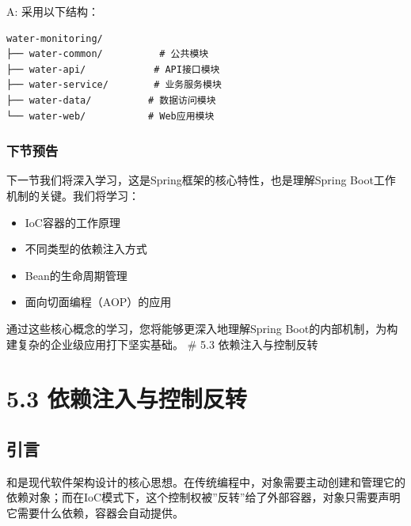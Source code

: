 
A: 采用以下结构：

\begin{lstlisting}
water-monitoring/
├── water-common/          # 公共模块
├── water-api/            # API接口模块  
├── water-service/        # 业务服务模块
├── water-data/          # 数据访问模块
└── water-web/           # Web应用模块
\end{lstlisting}

\hypertarget{ux4e0bux8282ux9884ux544a-1}{%
\subsubsection{下节预告}\label{ux4e0bux8282ux9884ux544a-1}}

下一节我们将深入学习，这是Spring框架的核心特性，也是理解Spring Boot工作机制的关键。我们将学习：

\begin{itemize}
\tightlist
\item
  IoC容器的工作原理
\item
  不同类型的依赖注入方式
\item
  Bean的生命周期管理
\item
  面向切面编程（AOP）的应用
\end{itemize}

通过这些核心概念的学习，您将能够更深入地理解Spring Boot的内部机制，为构建复杂的企业级应用打下坚实基础。 \# 5.3 依赖注入与控制反转

\hypertarget{ux4f9dux8d56ux6ce8ux5165ux4e0eux63a7ux5236ux53cdux8f6c}{%
\section{5.3 依赖注入与控制反转}\label{ux4f9dux8d56ux6ce8ux5165ux4e0eux63a7ux5236ux53cdux8f6c}}


\hypertarget{ux5f15ux8a00-3}{%
\subsection{引言}\label{ux5f15ux8a00-3}}

和是现代软件架构设计的核心思想。在传统编程中，对象需要主动创建和管理它的依赖对象；而在IoC模式下，这个控制权被''反转''给了外部容器，对象只需要声明它需要什么依赖，容器会自动提供。

